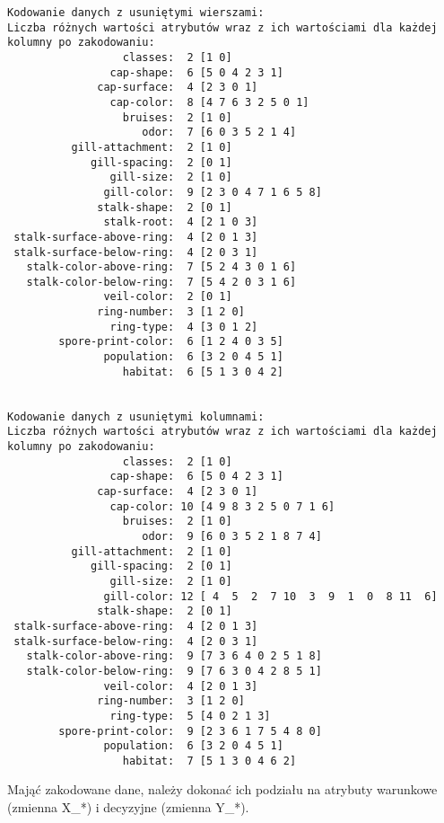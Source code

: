 \documentclass[10pt, a4paper, landscape]{article}
\begin{document}
    \begin{Verbatim}[commandchars=\\\{\}]
Kodowanie danych z usuniętymi wierszami:
Liczba różnych wartości atrybutów wraz z ich wartościami dla każdej kolumny po zakodowaniu:
                  classes:  2 [1 0]
                cap-shape:  6 [5 0 4 2 3 1]
              cap-surface:  4 [2 3 0 1]
                cap-color:  8 [4 7 6 3 2 5 0 1]
                  bruises:  2 [1 0]
                     odor:  7 [6 0 3 5 2 1 4]
          gill-attachment:  2 [1 0]
             gill-spacing:  2 [0 1]
                gill-size:  2 [1 0]
               gill-color:  9 [2 3 0 4 7 1 6 5 8]
              stalk-shape:  2 [0 1]
               stalk-root:  4 [2 1 0 3]
 stalk-surface-above-ring:  4 [2 0 1 3]
 stalk-surface-below-ring:  4 [2 0 3 1]
   stalk-color-above-ring:  7 [5 2 4 3 0 1 6]
   stalk-color-below-ring:  7 [5 4 2 0 3 1 6]
               veil-color:  2 [0 1]
              ring-number:  3 [1 2 0]
                ring-type:  4 [3 0 1 2]
        spore-print-color:  6 [1 2 4 0 3 5]
               population:  6 [3 2 0 4 5 1]
                  habitat:  6 [5 1 3 0 4 2]


Kodowanie danych z usuniętymi kolumnami:
Liczba różnych wartości atrybutów wraz z ich wartościami dla każdej kolumny po zakodowaniu:
                  classes:  2 [1 0]
                cap-shape:  6 [5 0 4 2 3 1]
              cap-surface:  4 [2 3 0 1]
                cap-color: 10 [4 9 8 3 2 5 0 7 1 6]
                  bruises:  2 [1 0]
                     odor:  9 [6 0 3 5 2 1 8 7 4]
          gill-attachment:  2 [1 0]
             gill-spacing:  2 [0 1]
                gill-size:  2 [1 0]
               gill-color: 12 [ 4  5  2  7 10  3  9  1  0  8 11  6]
              stalk-shape:  2 [0 1]
 stalk-surface-above-ring:  4 [2 0 1 3]
 stalk-surface-below-ring:  4 [2 0 3 1]
   stalk-color-above-ring:  9 [7 3 6 4 0 2 5 1 8]
   stalk-color-below-ring:  9 [7 6 3 0 4 2 8 5 1]
               veil-color:  4 [2 0 1 3]
              ring-number:  3 [1 2 0]
                ring-type:  5 [4 0 2 1 3]
        spore-print-color:  9 [2 3 6 1 7 5 4 8 0]
               population:  6 [3 2 0 4 5 1]
                  habitat:  7 [5 1 3 0 4 6 2]

    \end{Verbatim}

    Mająć zakodowane dane, należy dokonać ich podziału na atrybuty warunkowe
(zmienna X\_*) i decyzyjne (zmienna Y\_*).
\end{document}
